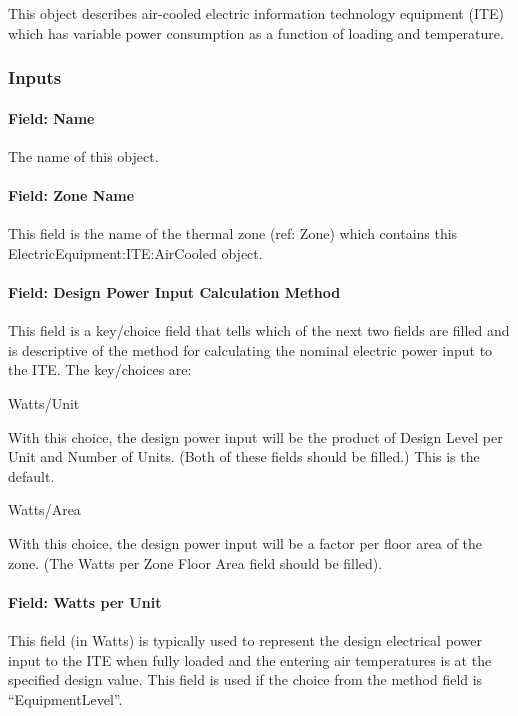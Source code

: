 This object describes air-cooled electric information technology equipment (ITE) which has variable power consumption as a function of loading and temperature.

\subsubsection{Inputs}\label{inputs-9-009}

\paragraph{Field: Name}\label{field-name-9-008}

The name of this object.

\paragraph{Field: Zone Name}\label{field-zone-name-1-005}

This field is the name of the thermal zone (ref: Zone) which contains this ElectricEquipment:ITE:AirCooled object.

\paragraph{Field: Design Power Input Calculation Method}\label{field-design-power-input-calculation-method}

This field is a key/choice field that tells which of the next two fields are filled and is descriptive of the method for calculating the nominal electric power input to the ITE. The key/choices are:

Watts/Unit

With this choice, the design power input will be the product of Design Level per Unit and Number of Units. (Both of these fields should be filled.) This is the default.

Watts/Area

With this choice, the design power input will be a factor per floor area of the zone. (The Watts per Zone Floor Area field should be filled).

\paragraph{Field: Watts per Unit}\label{field-watts-per-unit}

This field (in Watts) is typically used to represent the design electrical power input to the ITE when fully loaded and the entering air temperatures is at the specified design value. This field is used if the choice from the method field is ``EquipmentLevel''.

